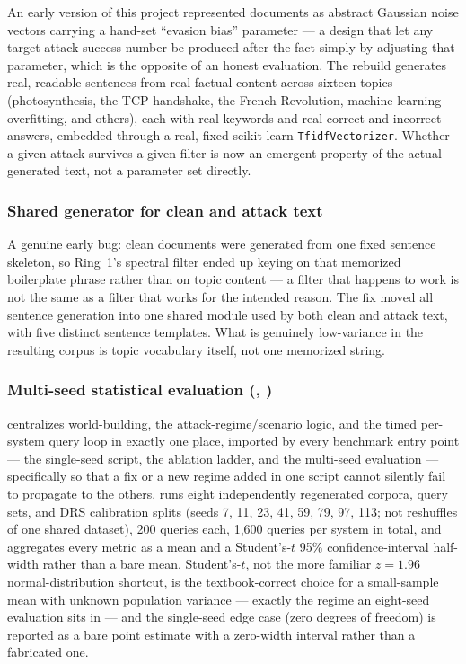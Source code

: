 An early version of this project represented documents as abstract
Gaussian noise vectors carrying a hand-set ``evasion bias'' parameter ---
a design that let any target attack-success number be produced after the
fact simply by adjusting that parameter, which is the opposite of an
honest evaluation. The rebuild generates real, readable sentences from
real factual content across sixteen topics (photosynthesis, the TCP
handshake, the French Revolution, machine-learning overfitting, and
others), each with real keywords and real correct and incorrect answers,
embedded through a real, fixed scikit-learn \texttt{TfidfVectorizer}.
Whether a given attack survives a given filter is now an emergent
property of the actual generated text, not a parameter set directly.

\subsubsection{Shared generator for clean and attack text}
\label{sec:shared-generator}

A genuine early bug: clean documents were generated from one fixed
sentence skeleton, so Ring~1's spectral filter ended up keying on that
memorized boilerplate phrase rather than on topic content --- a filter
that happens to work is not the same as a filter that works for the
intended reason. The fix moved all sentence generation into one shared
module used by both clean and attack text, with five distinct sentence
templates. What is genuinely low-variance in the resulting corpus is
topic vocabulary itself, not one memorized string.

\subsubsection{Multi-seed statistical evaluation (, )}
\label{sec:multiseed}

 centralizes world-building, the
attack-regime/scenario logic, and the timed per-system query loop in
exactly one place, imported by every benchmark entry point --- the
single-seed script, the ablation ladder, and the multi-seed evaluation
--- specifically so that a fix or a new regime added in one script cannot
silently fail to propagate to the others. 
runs eight independently regenerated corpora, query sets, and DRS
calibration splits (seeds 7, 11, 23, 41, 59, 79, 97, 113; not reshuffles
of one shared dataset), 200 queries each, 1,600 queries per system in
total, and  aggregates every metric as a mean and
a Student's-$t$ 95\% confidence-interval half-width rather than a bare
mean. Student's-$t$, not the more familiar $z=1.96$ normal-distribution
shortcut, is the textbook-correct choice for a small-sample mean with
unknown population variance --- exactly the regime an eight-seed
evaluation sits in --- and the single-seed edge case (zero degrees of
freedom) is reported as a bare point estimate with a zero-width interval
rather than a fabricated one.

